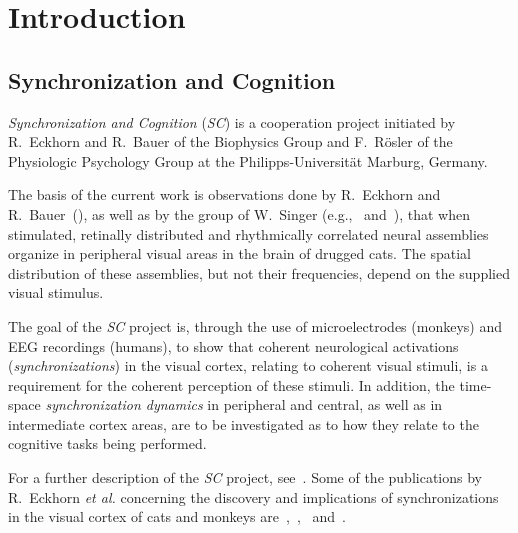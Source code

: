 
\chapter{Introduction}
\label{intro}

\section{Synchronization and Cognition}
\label{intro:synch}

{\em Synchronization and Cognition\/} ({\em SC\/}) is a cooperation
project initiated by R.\ Eckhorn and R.\ Bauer of the Biophysics Group
and F.\ R\"{o}sler of the Physiologic Psychology Group at the
Philipps-Universit\"{a}t Marburg, Germany.

The basis of the current work is observations done by R.\ Eckhorn and
R.\ Bauer~(\cite{cat}), as well as by the group of W.\ Singer
(e.g.,~\cite{singer2} and~\cite{singer1}), that when stimulated,
retinally distributed and rhythmically correlated neural assemblies
organize in peripheral visual areas in the brain of drugged cats.  The
spatial distribution of these assemblies, but not their frequencies,
depend on the supplied visual stimulus.

The goal of the {\em SC\/} project is, through the use of
microelectrodes (monkeys) and EEG recordings (humans), to show that
coherent neurological activations ({\em synchronizations\/}) in the
visual cortex, relating to coherent visual stimuli, is a requirement
for the coherent perception of these stimuli.  In addition, the
time-space {\em synchronization dynamics\/} in peripheral and central,
as well as in intermediate cortex areas, are to be investigated as to
how they relate to the cognitive tasks being performed.

For a further description of the {\em SC\/} project,
see~\cite{antrag}.  Some of the publications by R.\ Eckhorn {\em et
  al.\/} concerning the discovery and implications of synchronizations
in the visual cortex of cats and monkeys
are~\cite{eckhorn1},~\cite{eckhorn2},~\cite{cat} and~\cite{eckhorn3}.

